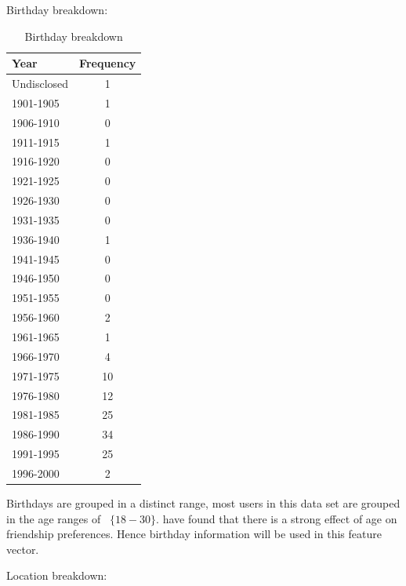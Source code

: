 \clearpage

Birthday breakdown:

\begin{table}[!htbp]
\centering
	\begin{tabular}{|l|c|} %
		\hline
		\textbf{Year} & \textbf{Frequency}  \\ \hline
		Undisclosed & 1 \\ \hline
		1901-1905 & 1 \\ \hline
		1906-1910 & 0 \\ \hline
		1911-1915 & 1 \\ \hline
		1916-1920 & 0 \\ \hline
		1921-1925 & 0 \\ \hline
		1926-1930 & 0 \\ \hline
		1931-1935 & 0 \\ \hline
		1936-1940 & 1 \\ \hline
		1941-1945 & 0 \\ \hline
		1946-1950 & 0 \\ \hline
		1951-1955 & 0 \\ \hline
		1956-1960 & 2 \\ \hline
		1961-1965 & 1 \\ \hline
		1966-1970 & 4 \\ \hline
		1971-1975 & 10 \\ \hline
		1976-1980 & 12 \\ \hline
		1981-1985 & 25 \\ \hline
		1986-1990 & 34 \\ \hline
		1991-1995 & 25 \\ \hline
		1996-2000 & 2 \\ \hline
	\end{tabular}
	\caption{Birthday breakdown}
	\label{tab:revpol}
\end{table}

Birthdays are grouped in a distinct range, most users in this data set are grouped in the age ranges of ~$\{18 - 30\}$. \cite{jugand} have 
found that there is a strong effect of age on friendship preferences. Hence birthday information will be used in this feature vector.

\clearpage

Location breakdown:

